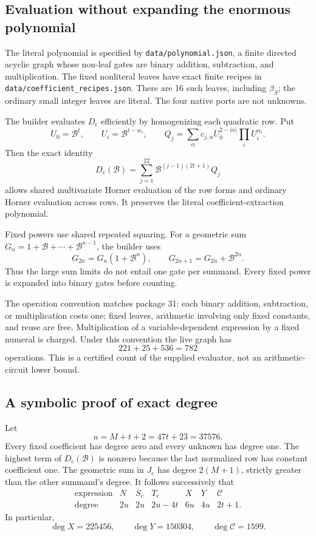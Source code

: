 \documentclass[11pt]{article}
\newcommand{\BB}{\mathcal B}
\newcommand{\capC}{\mathscr C}
\newcommand{\Dcode}{D_{\mathrm c}}
\newcommand{\file}[1]{\nolinkurl{#1}}
\theoremstyle{definition}
\theoremstyle{remark}
\numberwithin{equation}{section}
\begin{document}
\subsection{Evaluation without expanding the enormous polynomial}

The literal polynomial is specified by
\file{data/polynomial.json}, a finite directed acyclic graph whose
non-leaf gates are binary addition, subtraction, and multiplication.
The fixed nonliteral leaves have exact finite recipes in
\file{data/coefficient_recipes.json}. There are 16 such leaves,
including \(\beta_S\); the ordinary small integer leaves are literal.
The four native ports are not unknowns.

The builder evaluates \(\Dcode\) efficiently by homogenizing each
quadratic row. Put
\[
 U_0=\BB^t,\qquad U_i=\BB^{t-w_i},\qquad
 Q_j=\sum_\alpha c_{j,\alpha}
                   U_0^{2-|\alpha|}\prod_i U_i^{\alpha_i}.
\]
Then the exact identity
\[
 \Dcode(\BB)=\sum_{j=1}^{22}
       \BB^{(j-1)(2t+1)}Q_j
\]
allows shared multivariate Horner evaluation of the row forms and
ordinary Horner evaluation across rows. It preserves the literal
coefficient-extraction polynomial.

Fixed powers use shared repeated squaring. For a geometric sum
\(G_n=1+\BB+\cdots+\BB^{n-1}\), the builder uses
\[
 G_{2n}=G_n(1+\BB^n),\qquad
 G_{2n+1}=G_{2n}+\BB^{2n}.
\]
Thus the large sum limits do not entail one gate per summand.
Every fixed power is expanded into binary gates before counting.

The operation convention matches package 31:
each binary addition, subtraction, or multiplication costs one;
fixed leaves, arithmetic involving only fixed constants, and reuse
are free. Multiplication of a variable-dependent expression by a
fixed numeral is charged. Under this convention the live graph has
\[
 221+25+536=782
\]
operations. This is a certified count of the supplied evaluator, not
an arithmetic-circuit lower bound.

\subsection{A symbolic proof of exact degree}

Let
\[
 u=M+t+2=47t+23=37576.
\]
Every fixed coefficient has degree zero and every unknown has degree one.
The highest term of \(\Dcode(\BB)\) is nonzero because the last normalized
row has constant coefficient one. The geometric sum in \(J_{\mathrm c}\)
has degree \(2(M+1)\), strictly greater than the other summand's degree.
It follows successively that
\[
\begin{array}{c|cccccc}
\text{expression} &N&S_{\mathrm c}&T_{\mathrm c}&X&Y&\capC\\
\hline
\text{degree}&2u&2u&2u-4t&6u&4u&2t+1 .
\end{array}
\]
In particular,
\[
 \deg X=225456,\qquad\deg Y=150304,\qquad
 \deg\capC=1599.
\]
\end{document}
